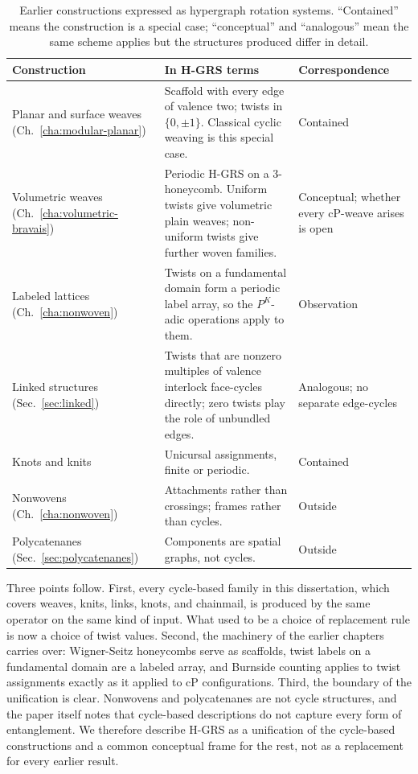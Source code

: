 \begin{table}[htbp]
\centering
\begin{singlespace}
\footnotesize
\begin{tabular}{@{}>{\raggedright\arraybackslash}p{}>{\raggedright\arraybackslash}p{}>{\raggedright\arraybackslash}p{}@{}}
\toprule
\textbf{Construction} & \textbf{In H-GRS terms} & \textbf{Correspondence} \\
\midrule
Planar and surface weaves (Ch.~\ref{cha:modular-planar}) & Scaffold with every edge of valence two; twists in $\{0,\pm1\}$. Classical cyclic weaving is this special case. & Contained \\[3pt]
Volumetric weaves (Ch.~\ref{cha:volumetric-bravais}) & Periodic H-GRS on a 3-honeycomb. Uniform twists give volumetric plain weaves; non-uniform twists give further woven families. & Conceptual; whether every cP-weave arises is open \\[3pt]
Labeled lattices (Ch.~\ref{cha:nonwoven}) & Twists on a fundamental domain form a periodic label array, so the $P^K$-adic operations apply to them. & Observation \\[3pt]
Linked structures (Sec.~\ref{sec:linked}) & Twists that are nonzero multiples of valence interlock face-cycles directly; zero twists play the role of unbundled edges. & Analogous; no separate edge-cycles \\[3pt]
Knots and knits & Unicursal assignments, finite or periodic. & Contained \\[3pt]
Nonwovens (Ch.~\ref{cha:nonwoven}) & Attachments rather than crossings; frames rather than cycles. & Outside \\[3pt]
Polycatenanes (Sec.~\ref{sec:polycatenanes}) & Components are spatial graphs, not cycles. & Outside \\
\bottomrule
\end{tabular}
\end{singlespace}
\caption[Earlier constructions expressed as hypergraph rotation systems.]{Earlier constructions expressed as hypergraph rotation systems. ``Contained'' means the construction is a special case; ``conceptual'' and ``analogous'' mean the same scheme applies but the structures produced differ in detail.}
\label{tab:hgrs-synthesis}
\end{table}

Three points follow. First, every cycle-based family in this dissertation, which covers weaves, knits, links, knots, and chainmail, is produced by the same operator on the same kind of input. What used to be a choice of replacement rule is now a choice of twist values. Second, the machinery of the earlier chapters carries over: Wigner-Seitz honeycombs serve as scaffolds, twist labels on a fundamental domain are a labeled array, and Burnside counting applies to twist assignments exactly as it applied to cP configurations. Third, the boundary of the unification is clear. Nonwovens and polycatenanes are not cycle structures, and the paper itself notes that cycle-based descriptions do not capture every form of entanglement. We therefore describe H-GRS as a unification of the cycle-based constructions and a common conceptual frame for the rest, not as a replacement for every earlier result.

